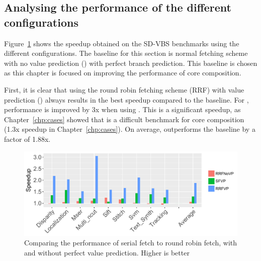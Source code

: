 \subsection{Analysing the performance of the different configurations}
Figure~\ref{fig:perf_pred} shows the speedup obtained on the SD-VBS benchmarks using the different configurations.
The baseline for this section is normal fetching scheme with no value prediction (\novp) with perfect branch prediction.
This baseline is chosen as this chapter is focused on improving the performance of core composition.


First, it is clear that using the round robin fetching scheme (RRF) with value prediction (\nfvp) always results in the best speedup compared to the baseline.
For , performance is improved by 3x when using \nfvp.
This is a significant speedup, as Chapter~\ref{chp:cases} showed that  is a difficult benchmark for core composition (1.3x speedup in Chapter~\ref{chp:cases}).
On average, \nfvp{} outperforms the baseline by a factor of 1.88x.

\begin{figure}[t]
    \centering
    \includegraphics[width=1\textwidth]{chapter3/graphics/tempres4.pdf}
    \caption{Comparing the performance of serial fetch to round robin fetch, with and without perfect value prediction. Higher is better}
    \label{fig:perf_pred}
\end{figure}


